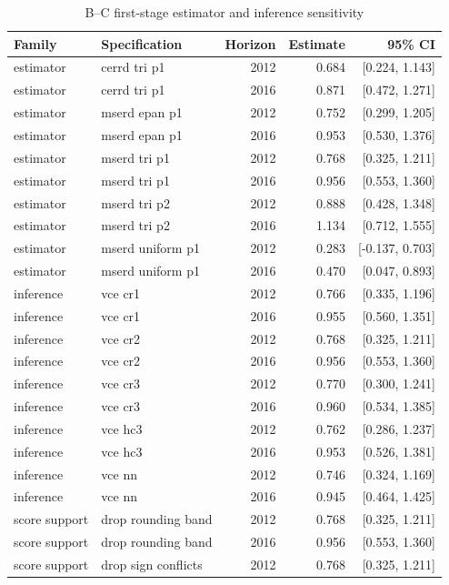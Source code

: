 \begin{table}[!htbp]
\centering
\scriptsize
\caption{B--C first-stage estimator and inference sensitivity}
\label{tab:rd_validation_sensitivity}
\begin{tabular}{llrrr}
\toprule
Family & Specification & Horizon & Estimate & 95\% CI \\
\midrule
estimator & cerrd tri p1 & 2012 & 0.684 & [0.224, 1.143] \\
estimator & cerrd tri p1 & 2016 & 0.871 & [0.472, 1.271] \\
estimator & mserd epan p1 & 2012 & 0.752 & [0.299, 1.205] \\
estimator & mserd epan p1 & 2016 & 0.953 & [0.530, 1.376] \\
estimator & mserd tri p1 & 2012 & 0.768 & [0.325, 1.211] \\
estimator & mserd tri p1 & 2016 & 0.956 & [0.553, 1.360] \\
estimator & mserd tri p2 & 2012 & 0.888 & [0.428, 1.348] \\
estimator & mserd tri p2 & 2016 & 1.134 & [0.712, 1.555] \\
estimator & mserd uniform p1 & 2012 & 0.283 & [-0.137, 0.703] \\
estimator & mserd uniform p1 & 2016 & 0.470 & [0.047, 0.893] \\
inference & vce cr1 & 2012 & 0.766 & [0.335, 1.196] \\
inference & vce cr1 & 2016 & 0.955 & [0.560, 1.351] \\
inference & vce cr2 & 2012 & 0.768 & [0.325, 1.211] \\
inference & vce cr2 & 2016 & 0.956 & [0.553, 1.360] \\
inference & vce cr3 & 2012 & 0.770 & [0.300, 1.241] \\
inference & vce cr3 & 2016 & 0.960 & [0.534, 1.385] \\
inference & vce hc3 & 2012 & 0.762 & [0.286, 1.237] \\
inference & vce hc3 & 2016 & 0.953 & [0.526, 1.381] \\
inference & vce nn & 2012 & 0.746 & [0.324, 1.169] \\
inference & vce nn & 2016 & 0.945 & [0.464, 1.425] \\
score support & drop rounding band & 2012 & 0.768 & [0.325, 1.211] \\
score support & drop rounding band & 2016 & 0.956 & [0.553, 1.360] \\
score support & drop sign conflicts & 2012 & 0.768 & [0.325, 1.211] \\

\end{tabular}
\end{table}
